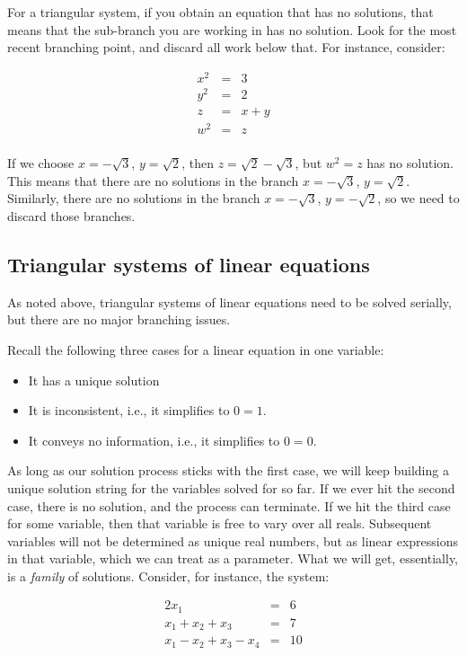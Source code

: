 \documentclass[10pt]{amsart}
\begin{document}
For a triangular system, if you obtain an equation that has no
solutions, that means that the sub-branch you are working in has no
solution. Look for the most recent branching point, and discard all
work below that. For instance, consider:

\begin{eqnarray*}
  x^2 & = & 3\\
  y^2 & = & 2\\
  z   & = & x + y \\
  w^2 & = & z \\
\end{eqnarray*}

If we choose $x = -\sqrt{3}$, $y = \sqrt{2}$, then $z = \sqrt{2} -
\sqrt{3}$, but $w^2 = z$ has no solution. This means that there are no
solutions in the branch $x = -\sqrt{3}$, $y = \sqrt{2}$. Similarly,
there are no solutions in the branch $x = -\sqrt{3}$, $y =
-\sqrt{2}$, so we need to discard those branches.

\subsection{Triangular systems of linear equations}

As noted above, triangular systems of linear equations need to be
solved serially, but there are no major branching issues.

Recall the following three cases for a linear equation in one variable:

\begin{itemize}
\item It has a unique solution
\item It is inconsistent, i.e., it simplifies to $0 = 1$.
\item It conveys no information, i.e., it simplifies to $0 = 0$.
\end{itemize}

As long as our solution process sticks with the first case, we will
keep building a unique solution string for the variables solved for so
far. If we ever hit the second case, there is no solution, and the
process can terminate. If we hit the third case for some variable,
then that variable is free to vary over all reals. Subsequent
variables will not be determined as unique real numbers, but as linear
expressions in that variable, which we can treat as a parameter. What
we will get, essentially, is a {\em family} of solutions. Consider, for instance, the system:

\begin{eqnarray*}
  2x_1 & =  & 6\\
  x_1 + x_2 + x_3 & = & 7 \\
  x_1 - x_2 + x_3 - x_4 & = & 10 \\
\end{eqnarray*}
\end{document}
